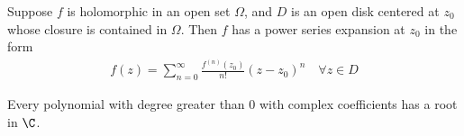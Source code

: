 \documentclass[thmcnt=section, color=cyan, 12pt]{my-elegantbook}
\begin{document}
\begin{theorem} \label{thm:1}
    Suppose $f$ is holomorphic in an open set $\Omega$, and $D$ is an open disk
    centered at $z_0$ whose closure is contained in $\Omega$. Then $f$ has a power
    series expansion at $z_0$ in the form
    \begin{align}
        f(z) = \sum_{n=0}^\infty \frac{f^{(n)}(z_0)}{n!}  (z - z_0)^n \quad \forall z \in D
        \label{eq:1}
    \end{align}
\end{theorem}

\begin{theorem} \label{thm:2}
\end{theorem}

\begin{theorem} \label{thm:3}
    Every polynomial with degree greater than $0$ with complex coefficients has a
    root in $\C$.
\end{theorem}
\end{document}
